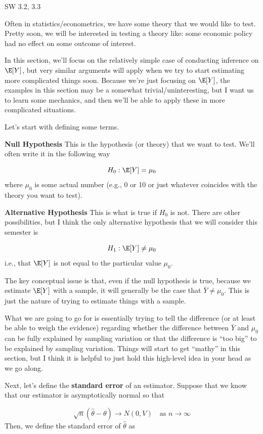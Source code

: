 \documentclass[
  letterpaper,
  DIV=11,
  numbers=noendperiod]{scrreprt}
\begin{document}
SW 3.2, 3.3

Often in statistics/econometrics, we have some theory that we would like
to test. Pretty soon, we will be interested in testing a theory like:
some economic policy had no effect on some outcome of interest.

In this section, we'll focus on the relatively simple case of conducting
inference on \(\E[Y]\), but very similar arguments will apply when we
try to start estimating more complicated things soon. Because we're just
focusing on \(\E[Y]\), the examples in this section may be a somewhat
trivial/uninteresting, but I want us to learn some mechanics, and then
we'll be able to apply these in more complicated situations.

Let's start with defining some terms.

\textbf{Null Hypothesis} This is the hypothesis (or theory) that we want
to test. We'll often write it in the following way

\[
  H_0 : \E[Y] = \mu_0
\] where \(\mu_0\) is some actual number (e.g., 0 or 10 or just whatever
coincides with the theory you want to test).

\textbf{Alternative Hypothesis} This is what is true if \(H_0\) is not.
There are other possibilities, but I think the only alternative
hypothesis that we will consider this semester is

\[
  H_1 : \E[Y] \neq \mu_0
\] i.e., that \(\E[Y]\) is not equal to the particular value \(\mu_0\).

The key conceptual issue is that, even if the null hypothesis is true,
because we estimate \(\E[Y]\) with a sample, it will generally be the
case that \(\bar{Y} \neq \mu_0\). This is just the nature of trying to
estimate things with a sample.

What we are going to go for is essentially trying to tell the difference
(or at least be able to weigh the evidence) regarding whether the
difference between \(\bar{Y}\) and \(\mu_0\) can be fully explained by
sampling variation or that the difference is ``too big'' to be explained
by sampling variation. Things will start to get ``mathy'' in this
section, but I think it is helpful to just hold this high-level idea in
your head as we go along.

Next, let's define the \textbf{standard error} of an estimator. Suppose
that we know that our estimator is asymptotically normal so that

\[
  \sqrt{n}(\hat{\theta} - \theta) \rightarrow N(0,V) \quad \textrm{as } n \rightarrow \infty
\] Then, we define the standard error of \(\hat{\theta}\) as
\end{document}
